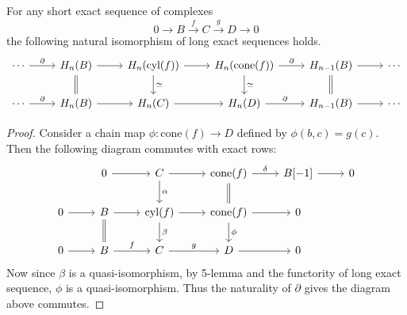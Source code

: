 \begin{prop} For any short exact sequence of complexes
\begin{equation}
0\rightarrow B\xrightarrow{f} C\xrightarrow{g} D\rightarrow 0
\end{equation}
the following natural isomorphism of long exact sequences holds.
\begin{equation}
\begin{tikzcd}
\cdots \arrow{r}{\partial} &H_n(B)\arrow[d,equal] \arrow[r]&H_n(\textrm{cyl}(f))\arrow{d}{\simeq} \arrow{r} &H_n(\textrm{cone}(f))\arrow{d}{\simeq} \arrow{r}{\partial} &H_{n-1}(B)\arrow[d,equal]\arrow{r}&\cdots\\
\cdots \arrow{r}{\partial} &H_n(B) \arrow[r]&H_n(C) \arrow{r} &H_n(D) \arrow{r}{\partial} &H_{n-1}(B)\arrow{r}&\cdots
\end{tikzcd}
\end{equation}
\end{prop}
\begin{proof}
Consider a chain map $\phi:\textrm{cone}(f)\rightarrow D$ defined by $\phi(b,c)=g(c)$. Then the following diagram commutes with exact rows:
\begin{equation}
\begin{tikzcd}
&0\arrow[r]&C\arrow[r]\arrow{d}{\alpha}&\textrm{cone}(f)\arrow{r}{\delta}\arrow[d,equal]&B[-1]\arrow[r]&0\\
0\arrow[r]&B\arrow[r]\arrow[d,equal]&\textrm{cyl}(f)\arrow[r]\arrow{d}{\beta}&\textrm{cone}(f)\arrow[r]\arrow{d}{\phi}&0&\\
0\arrow[r]&B\arrow{r}{f}&C\arrow{r}{g}&D\arrow[r]&0&
\end{tikzcd}
\end{equation}
Now since $\beta$ is a quasi-isomorphism, by 5-lemma and the functority of long exact sequence, $\phi$ is a quasi-isomorphism. Thus the naturality of $\partial$ gives the diagram above commutes.
\end{proof}

